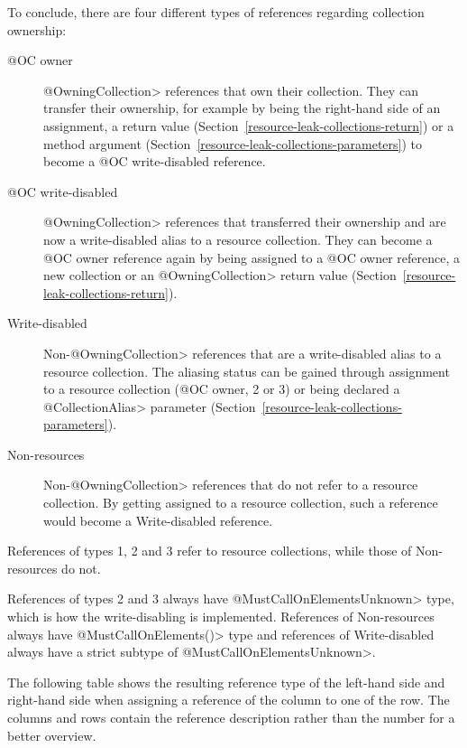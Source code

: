 To conclude, there are four different types of references regarding collection ownership:
\begin{description}
  \item[@OC owner] \<@OwningCollection> references that own their collection. They can transfer their ownership, for example by being the right-hand side of an assignment, a return value (Section~\ref{resource-leak-collections-return}) or a method argument (Section~\ref{resource-leak-collections-parameters}) to become a @OC write-disabled reference.
  \item[@OC write-disabled] \<@OwningCollection> references that transferred their ownership and are now a write-disabled alias to a resource collection. They can become a @OC owner reference again by being assigned to a @OC owner reference, a new collection or an \<@OwningCollection> return value (Section~\ref{resource-leak-collections-return}).
  \item[Write-disabled] Non-\<@OwningCollection> references that are a write-disabled alias to a resource collection. The aliasing status can be gained through assignment to a resource collection (@OC owner, 2 or 3) or being declared a \<@CollectionAlias> parameter (Section~\ref{resource-leak-collections-parameters}).
  \item[Non-resources] Non-\<@OwningCollection> references that do not refer to a resource collection. By getting assigned to a resource collection, such a reference would become a Write-disabled reference.
\end{description}

\noindent References of types 1, 2 and 3 refer to resource collections, while those of Non-resources do not.

\noindent References of types 2 and 3 always have \<@MustCallOnElementsUnknown> type, which is how the write-disabling is implemented. References of Non-resources always have \<@MustCallOnElements({})> type and references of Write-disabled always have a strict subtype of \<@MustCallOnElementsUnknown>.

The following table shows the resulting reference type of the left-hand side and right-hand side when assigning a reference of the column to one of the row. The columns and rows contain the reference description rather than the number for a better overview.

